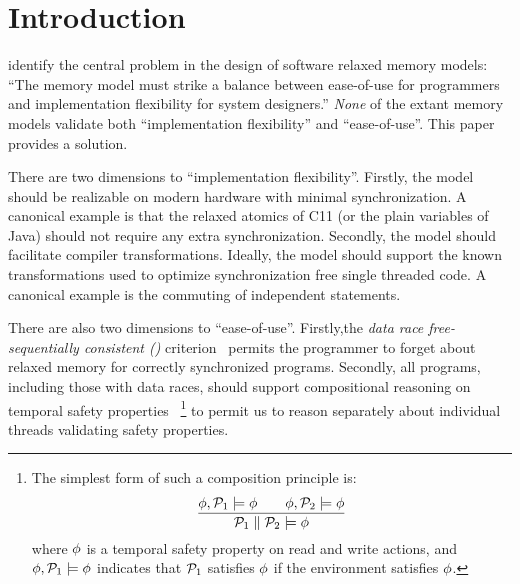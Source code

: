 \section{Introduction}
\citet{Manson:2005:JMM:1047659.1040336} identify the central problem in the design of software relaxed memory models: ``The memory model must strike a balance between ease-of-use for programmers and implementation flexibility for system designers.''   \emph{None} of the extant memory models validate both ``implementation flexibility'' and ``ease-of-use''.   This paper provides a solution.


There are two dimensions to ``implementation flexibility''.  Firstly, the model should be realizable on modern hardware with minimal synchronization.  A canonical example is that the relaxed atomics of C11 (or the plain variables of Java) should not require any extra synchronization.  Secondly, the  model should facilitate compiler transformations.    Ideally, the model should support the known transformations used to optimize  synchronization free single threaded code.  A canonical example is the  commuting of independent statements.


There are also two dimensions to ``ease-of-use''.  Firstly,the \emph{data race free-sequentially consistent (\drfsc)} criterion~\cite{DBLP:journals/tpds/AdveH93, DBLP:conf/isca/AdveH90} permits the programmer to forget about relaxed memory for correctly synchronized programs.    Secondly, all programs, including those with data races,  should support compositional reasoning on temporal safety properties~\cite{PnueliSafety,Misra:1981:PNP:1313338.1313770,StarkSafety,Abadi:1993:CS:151646.151649} \footnote{The simplest form of such a composition principle is:
\[
  \frac{
      \phi, \mathcal{P}_1 \models\phi
      \qquad
      \phi, \mathcal{P}_2 \models\phi
    }{\mathcal{P}_1 \parallel \mathcal{P}_2 \models \phi}
\]
where $\phi$ is a temporal safety property on read and write actions, and $\phi, \mathcal{P}_1 \models\phi$ indicates that $\mathcal{P}_1$ satisfies $\phi$ if the environment satisfies $\phi$. } to permit us to reason separately about individual threads validating safety properties. 

